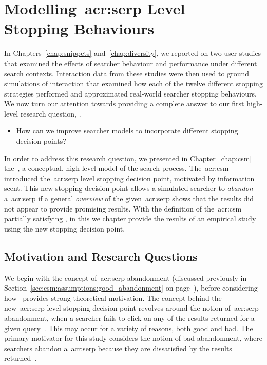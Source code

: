 
\chapter[Modelling SERP Level Stopping Behaviours]{Modelling~\gls{acr:serp} Level\\Stopping Behaviours}\label{chap:serp}
In Chapters~\ref{chap:snippets} and~\ref{chap:diversity}, we reported on two user studies that examined the effects of searcher behaviour and performance under different search contexts. Interaction data from these studies were then used to ground simulations of interaction that examined how each of the twelve different stopping strategies performed and approximated real-world searcher stopping behaviours. We now turn our attention towards providing a complete answer to our first high-level research question, .

\begin{itemize}
    \item{ How can we improve searcher models to incorporate different stopping decision points?}
\end{itemize}

In order to address this research question, we presented in Chapter~\ref{chap:csm} the~, a conceptual, high-level model of the search process. The~\gls{acr:csm} introduced the~\gls{acr:serp} level stopping decision point, motivated by information scent. This new stopping decision point allows a simulated searcher to \emph{abandon} a~\gls{acr:serp} if a general \emph{overview} of the given~\gls{acr:serp} shows that the results did not appear to provide promising results. With the definition of the~\gls{acr:csm} partially satisfying , in this we chapter provide the results of an empirical study using the new stopping decision point.

\section{Motivation and Research Questions}\label{sec:serp:background}
We begin with the concept of~\gls{acr:serp} abandonment (discussed previously in Section~\ref{sec:csm:assumptions:good_abandonment} on page~\pageref{sec:csm:assumptions:good_abandonment}), before considering how~ provides strong theoretical motivation. The concept behind the new~\gls{acr:serp} level stopping decision point revolves around the notion of~\gls{acr:serp} abandonment, when a searcher fails to click on any of the results returned for a given query~\citep{diriye2012abandonment, hassan2013serp_abandonment}. This may occur for a variety of reasons, both good and bad. The primary motivator for this study considers the notion of bad abandonment, where searchers abandon a~\gls{acr:serp} because they are dissatisfied by the results returned~\citep{hassan2013serp_abandonment}.

